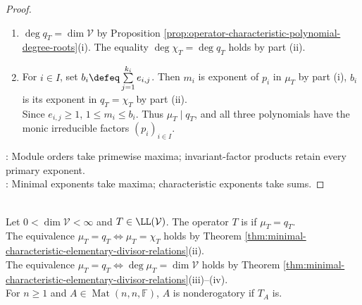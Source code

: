 \begin{theorem}
\begin{proof}
\begin{enumerate}[label=(\roman*)]
The column construction uses every elementary divisor once by Definition \ref{def:invariant-factors-pid-module}.\\
Its monic column products are the $f_\ell$ by Definition \ref{def:operator-invariant-factors-elementary-divisors}(ii)--(iii).\\
Hence $\prod\limits_{\ell=1}^rf_\ell=\prod\limits_{i\in I}\prod\limits_{j=1}^{k_i}p_i^{e_{i,j}}$. The latter product is $\chi_T$ by Definition \ref{def:characteristic-polynomial-from-elementary-divisors}.
\item $\deg q_T=\dim\mathcal{V}$ by Proposition \ref{prop:operator-characteristic-polynomial-degree-roots}(i). The equality $\deg\chi_T=\deg q_T$ holds by part (ii).
\item For $i\in I$, set $b_i\defeq\sum\limits_{j=1}^{k_i}e_{i,j}$. Then $m_i$ is exponent of $p_i$ in $\mu_T$ by part (i), $b_i$ is its exponent in $q_T=\chi_T$ by part (ii).\\
Since $e_{i,j}\geq1$, $1\leq m_i\leq b_i$. Thus $\mu_T\mid q_T$, and all three polynomials have the monic irreducible factors $(p_i)_{i\in I}$.
\end{enumerate}
: Module orders take primewise maxima; invariant-factor products retain every primary exponent.\\
: Minimal exponents take maxima; characteristic exponents take sums.
\end{proof}
\end{theorem}

\begin{definition} \label{def:nonderogatory-operator-module} \\
Let $0<\dim\mathcal{V}<\infty$ and $T\in\LL(\mathcal{V})$. The operator $T$ is  if $\mu_T=q_T$.\\
The equivalence $\mu_T=q_T\Longleftrightarrow\mu_T=\chi_T$ holds by Theorem \ref{thm:minimal-characteristic-elementary-divisor-relations}(ii).\\
The equivalence $\mu_T=q_T\Longleftrightarrow\deg\mu_T=\dim\mathcal{V}$ holds by Theorem \ref{thm:minimal-characteristic-elementary-divisor-relations}(iii)--(iv).\\
For $n\geq1$ and $A\in\operatorname{Mat}(n,n,\mathbb{F})$, $A$ is nonderogatory if $T_A$ is.
\end{definition}

